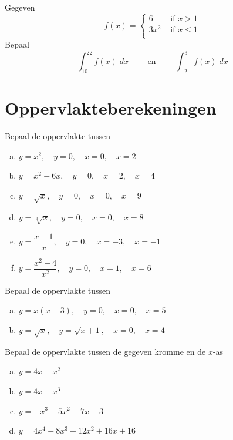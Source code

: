 \documentclass[a4paper,12pt]{article}
\begin{document}
\begin{oefening} %
Gegeven
$$f(x)=\begin{cases}6 & \mbox{ if } x > 1\\3x^2 & \mbox{ if } x \leq 1\\\end{cases}$$
Bepaal
$$\displaystyle \int_{10}^{22} f(x) \;dx \qquad\mbox{ en }\qquad \displaystyle \int_{-2}^{3} f(x) \;dx$$
\end{oefening}

\section{Oppervlakteberekeningen}

\begin{oefening}
Bepaal de oppervlakte tussen
\begin{enumerate}[(a)]
\itemsep1em
  \item $\displaystyle y=x^2,\quad y=0,\quad x=0, \quad x=2$
  \item $\displaystyle y=x^2-6x,\quad y=0,\quad x=2, \quad x=4$
  \item $\displaystyle y=\sqrt{x},\quad y=0,\quad x=0, \quad x=9$
  \item $\displaystyle y=\sqrt[3]{x},\quad y=0,\quad x=0, \quad x=8$
  \item $\displaystyle y=\dfrac{x-1}{x},\quad y=0,\quad x=-3, \quad x=-1$
  \item $\displaystyle y=\dfrac{x^2-4}{x^2},\quad y=0,\quad x=1, \quad x=6$
\end{enumerate}
\end{oefening}

\begin{oefening}
Bepaal de oppervlakte tussen
\begin{enumerate}[(a)]
\itemsep1em
  \item $\displaystyle y=x(x-3),\quad y=0,\quad x=0, \quad x=5$
  \item $\displaystyle y=\sqrt{x},\quad y=\sqrt{x+1},\quad x=0, \quad x=4$
\end{enumerate}
\end{oefening}


\begin{oefening}
Bepaal de oppervlakte tussen de gegeven kromme en de $x$-as
\begin{multicols}{2}
\begin{enumerate}[(a)]
\itemsep1em
  \item $\displaystyle y=4x-x^2$
  \item $\displaystyle y=4x-x^3$
  \item $\displaystyle y=-x^3+5x^2-7x+3$
  \item $\displaystyle y=4x^4-8x^3-12x^2+16x+16$
\end{enumerate}
\end{multicols}
\end{oefening}
\end{document}
